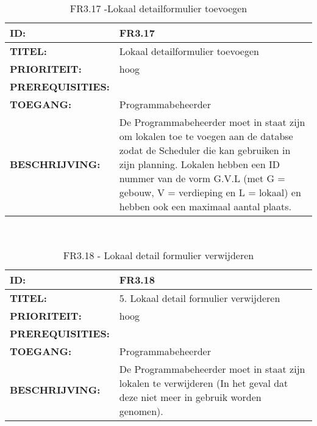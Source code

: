    
\noindent\begin{table}[H]
            \begin{tabular}{l | p{10cm}}
                \textbf{ID:} & FR3.17 \\ \hline
                \textbf{TITEL:} & Lokaal detailformulier toevoegen\\ \hline
                \textbf{PRIORITEIT:} &  hoog \\ \hline
                \textbf{PREREQUISITIES:} & \\ \hline
                \textbf{TOEGANG:} & Programmabeheerder \\ \hline
                \textbf{BESCHRIJVING:} & De Programmabeheerder moet in staat zijn om lokalen toe te voegen aan de databse zodat de Scheduler die kan gebruiken in zijn planning. Lokalen hebben een ID nummer van de vorm G.V.L (met G = gebouw, V = verdieping en L = lokaal) en hebben ook een maximaal aantal plaats.\\ 
            \end{tabular}\\
            \caption{FR3.17 -Lokaal detailformulier toevoegen}
            \label{tab:FR3.17 - Lokaal detailformulier toevoegen}
        \end{table}


\noindent\begin{table}[H]
            \begin{tabular}{l | p{10cm}}
                \textbf{ID:} & FR3.18 \\ \hline
                \textbf{TITEL:} & 5. Lokaal detail formulier verwijderen\\ \hline
                \textbf{PRIORITEIT:} &  hoog \\ \hline
                \textbf{PREREQUISITIES:} & \\ \hline
                \textbf{TOEGANG:} & Programmabeheerder \\ \hline
                \textbf{BESCHRIJVING:} & De Programmabeheerder moet in staat zijn lokalen te verwijderen (In het geval dat deze niet meer in gebruik worden genomen).\\ 
            \end{tabular}\\
            \caption{FR3.18 - Lokaal detail formulier verwijderen}
            \label{tab:FR3.18 - Lokaal detail formulier verwijderen}
        \end{table}
        
